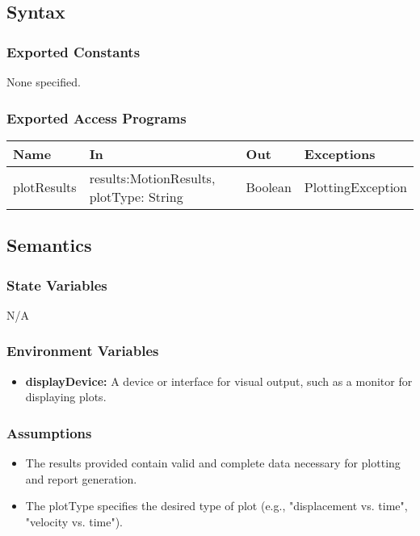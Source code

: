 \documentclass[12pt, titlepage]{article}
\begin{document}
\subsection{Syntax}

\subsubsection{Exported Constants}
None specified.

\subsubsection{Exported Access Programs}

\begin{center}
\begin{tabular}{p{4cm} p{4cm} p{3cm} p{5cm}}
\hline
\textbf{Name} & \textbf{In} & \textbf{Out} & \textbf{Exceptions} \\
\hline
plotResults & results:MotionResults, plotType: String & Boolean & PlottingException \\
\hline
\end{tabular}
\end{center}

\subsection{Semantics}

\subsubsection{State Variables}
N/A

\subsubsection{Environment Variables}
\begin{itemize}
  \item \textbf{displayDevice:} A device or interface for visual output, such as a monitor for displaying plots.
\end{itemize}

\subsubsection{Assumptions}

\begin{itemize}
  \item The results provided contain valid and complete data necessary for plotting and report generation.
  \item The plotType specifies the desired type of plot (e.g., "displacement vs. time", "velocity vs. time").
\end{itemize}
\end{document}
